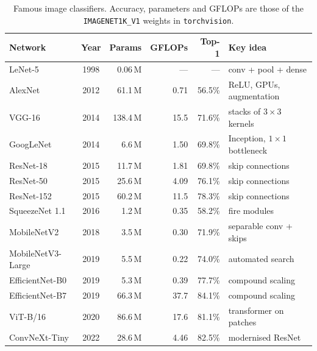 \documentclass[12pt, a4paper]{article}
\begin{document}
\begin{table}[H]
  \centering
  \small
  \renewcommand{\arraystretch}{1.3}
  \begin{tabular}{lcrrrl}
    \toprule
    Network           & Year & Params   & GFLOPs & Top-1  & Key idea                         \\
    \midrule
    LeNet-5           & 1998 & 0.06\,M  & ---    & ---    & conv + pool + dense              \\
    AlexNet           & 2012 & 61.1\,M  & 0.71   & 56.5\% & ReLU, GPUs, augmentation         \\
    VGG-16            & 2014 & 138.4\,M & 15.5   & 71.6\% & stacks of $3\times3$ kernels     \\
    GoogLeNet         & 2014 & 6.6\,M   & 1.50   & 69.8\% & Inception, $1\times1$ bottleneck \\
    ResNet-18         & 2015 & 11.7\,M  & 1.81   & 69.8\% & skip connections                 \\
    ResNet-50         & 2015 & 25.6\,M  & 4.09   & 76.1\% & skip connections                 \\
    ResNet-152        & 2015 & 60.2\,M  & 11.5   & 78.3\% & skip connections                 \\
    SqueezeNet 1.1    & 2016 & 1.2\,M   & 0.35   & 58.2\% & fire modules                     \\
    MobileNetV2       & 2018 & 3.5\,M   & 0.30   & 71.9\% & separable conv + skips           \\
    MobileNetV3-Large & 2019 & 5.5\,M   & 0.22   & 74.0\% & automated search                 \\
    EfficientNet-B0   & 2019 & 5.3\,M   & 0.39   & 77.7\% & compound scaling                 \\
    EfficientNet-B7   & 2019 & 66.3\,M  & 37.7   & 84.1\% & compound scaling                 \\
    ViT-B/16          & 2020 & 86.6\,M  & 17.6   & 81.1\% & transformer on patches           \\
    ConvNeXt-Tiny     & 2022 & 28.6\,M  & 4.46   & 82.5\% & modernised ResNet                \\
    \bottomrule
  \end{tabular}
  \caption{Famous image classifiers. Accuracy, parameters and GFLOPs are
    those of the \texttt{IMAGENET1K\_V1} weights in \texttt{torchvision}.}
  \label{tab:comparison}
\end{table}
\end{document}
